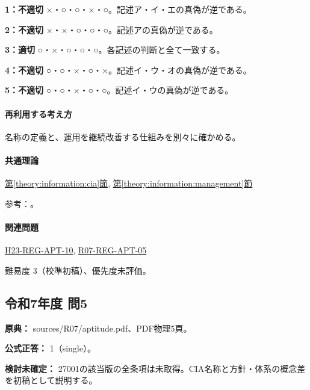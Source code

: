 \noindent\textbf{1：不適切} ×・○・○・×・○。記述ア・イ・エの真偽が逆である。\par

\noindent\textbf{2：不適切} ×・×・○・○・○。記述アの真偽が逆である。\par

\noindent\textbf{3：適切} ○・×・○・○・○。各記述の判断と全て一致する。\par

\noindent\textbf{4：不適切} ○・○・×・○・×。記述イ・ウ・オの真偽が逆である。\par

\noindent\textbf{5：不適切} ○・○・×・○・○。記述イ・ウの真偽が逆である。\par

\paragraph{再利用する考え方} 名称の定義と、運用を継続改善する仕組みを別々に確かめる。

\paragraph{共通理論} \hyperref[theory:information:cia]{第\ref*{theory:information:cia}節}, \hyperref[theory:information:management]{第\ref*{theory:information:management}節}

\par 参考：\cite{iso27000_2009}。

\paragraph{関連問題} \hyperref[q:h23-reg-apt-10]{H23-REG-APT-10}, \hyperref[q:r07-reg-apt-05]{R07-REG-APT-05}

\par 難易度 3（校準初稿）、優先度未評価。

\subsection{令和7年度 問5}
\label{q:r07-reg-apt-05}

\noindent\textbf{原典：} sources/R07/aptitude.pdf、PDF物理5頁。

\textbf{公式正答：} 1（single）。

\par\textbf{検討未確定：} 27001の該当版の全条項は未取得。CIA名称と方針・体系の概念差を初稿として説明する。


